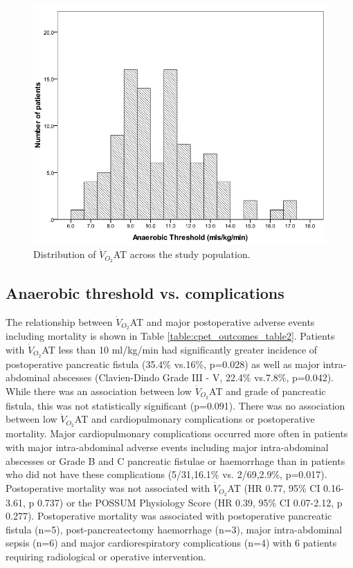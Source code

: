 \begin{figure}[htbp]
	\centering
	\includegraphics[width=0.8\linewidth]{Figures/cpet_outcomes_dist_of_AT}
	\caption{Distribution of $\dot{V}_{O_2}$AT across the study population.}
	\label{fig:cpet_outcomes_dist_of_AT}
\end{figure}

\subsection{Anaerobic threshold vs. complications}
The relationship between $\dot{V}_{O_2}$AT and major postoperative adverse events including mortality is shown in Table \ref{table:cpet_outcomes_table2}. 
Patients with $\dot{V}_{O_2}$AT less than 10 ml/kg/min had significantly greater incidence of postoperative pancreatic fistula (35.4\% vs.16\%, p=0.028) as well as major intra-abdominal abscesses (Clavien-Dindo Grade III - V, 22.4\% vs.7.8\%, p=0.042). 
While there was an association between low $\dot{V}_{O_2}$AT and grade of pancreatic fistula, this was not statistically significant (p=0.091). 
There was no association between low $\dot{V}_{O_2}$AT and cardiopulmonary complications or postoperative mortality. 
Major cardiopulmonary complications occurred more often in patients with major intra-abdominal adverse events including major intra-abdominal abscesses or Grade B and C pancreatic fistulae or haemorrhage than in patients who did not have these complications (5/31,16.1\% vs. 2/69,2.9\%, p=0.017). 
Postoperative mortality was not associated with $\dot{V}_{O_2}$AT (HR 0.77, 95\% CI 0.16-3.61, p 0.737) or the POSSUM Physiology Score (HR 0.39, 95\% CI 0.07-2.12, p 0.277). 
Postoperative mortality was associated with postoperative pancreatic fistula (n=5), post-pancreatectomy haemorrhage (n=3), major intra-abdominal sepsis (n=6) and major cardiorespiratory complications (n=4) with 6 patients requiring radiological or operative intervention.

